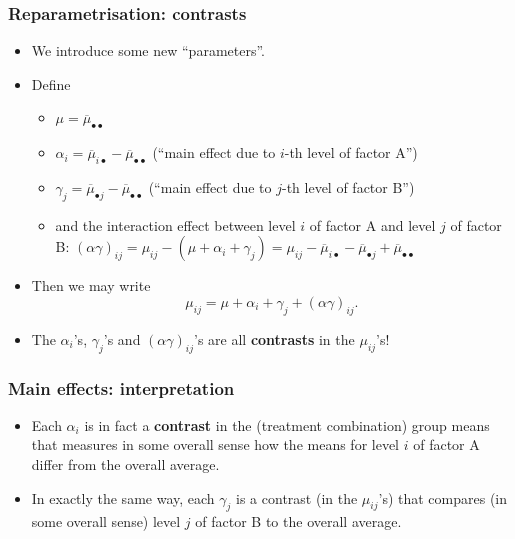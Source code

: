 \documentclass[a4paper]{article}\usepackage[]{graphicx}\usepackage[]{xcolor}
\begin{document}
\subsubsection{Reparametrisation: contrasts}
\begin{itemize}
	\item We introduce some new ``parameters''.
	\item Define
	\begin{itemize}
		\item \( \mu = \overline\mu_{\bullet\bullet} \) 
		\item \( \alpha_i = \overline{\mu}_{i\bullet}-\overline\mu_{\bullet\bullet} \) (``main effect due to \( i \)-th level of factor A'')
		\item \( \gamma_j = \overline{\mu}_{\bullet j}-\overline\mu_{\bullet\bullet} \) (``main effect due to \( j \)-th level of factor B'')
		\item and the interaction effect between level \( i \) of factor A and level \( j \) of factor B: \( (\alpha\gamma)_{ij} = \mu_{ij}-(\mu+\alpha_i+\gamma_j) =\mu_{ij}-\overline \mu_{i\bullet} -\overline\mu_{\bullet j}+\overline \mu_{\bullet\bullet} \) 
	\end{itemize}
	\item Then we may write
	\[
		\mu_{ij}=\mu + \alpha_i + \gamma_j + (\alpha\gamma)_{ij}.
	\]
	\item The \( \alpha_i \)'s, \( \gamma_j \)'s and \( (\alpha \gamma)_{ij} \)'s are all \textbf{contrasts} in the \( \mu_{ij} \)'s!
\end{itemize}
\subsubsection{Main effects: interpretation}
\begin{itemize}
	\item Each \( \alpha_i \) is in fact a \textbf{contrast} in the (treatment combination) group means that measures in some overall sense how the means for level \( i \) of factor A differ from the overall average.
	\item In exactly the same way, each \( \gamma_j \) is a contrast (in the \( \mu_{ij} \)'s) that compares (in some overall sense) level \( j \) of factor B to the overall average.
\end{itemize}
\end{document}
